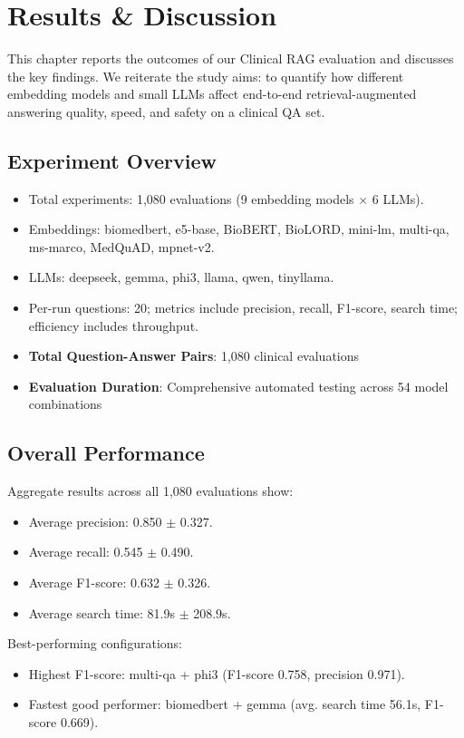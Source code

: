 \chapter{Results \& Discussion}
\label{chap:results}

\noindent This chapter reports the outcomes of our Clinical RAG evaluation and discusses the key findings. We reiterate the study aims: to quantify how different embedding models and small LLMs affect end-to-end retrieval-augmented answering quality, speed, and safety on a clinical QA set.

\section{Experiment Overview}
\begin{itemize}
  \item Total experiments: 1,080 evaluations (9 embedding models \(\times\) 6 LLMs).
  \item Embeddings: biomedbert, e5-base, BioBERT, BioLORD, mini-lm, multi-qa, ms-marco, MedQuAD, mpnet-v2.
  \item LLMs: deepseek, gemma, phi3, llama, qwen, tinyllama.
  \item Per-run questions: 20; metrics include precision, recall, F1-score, search time; efficiency includes throughput.
  \item \textbf{Total Question-Answer Pairs}: 1,080 clinical evaluations
  \item \textbf{Evaluation Duration}: Comprehensive automated testing across 54 model combinations
\end{itemize}

\section{Overall Performance}
Aggregate results across all 1,080 evaluations show:
\begin{itemize}
  \item Average precision: 0.850 $\pm$ 0.327.
  \item Average recall: 0.545 $\pm$ 0.490.
  \item Average F1-score: 0.632 $\pm$ 0.326.
  \item Average search time: 81.9s $\pm$ 208.9s.
\end{itemize}

Best-performing configurations:
\begin{itemize}
  \item Highest F1-score: multi-qa + phi3 (F1-score 0.758, precision 0.971).
  \item Fastest good performer: biomedbert + gemma (avg. search time 56.1s, F1-score 0.669).
\end{itemize}


